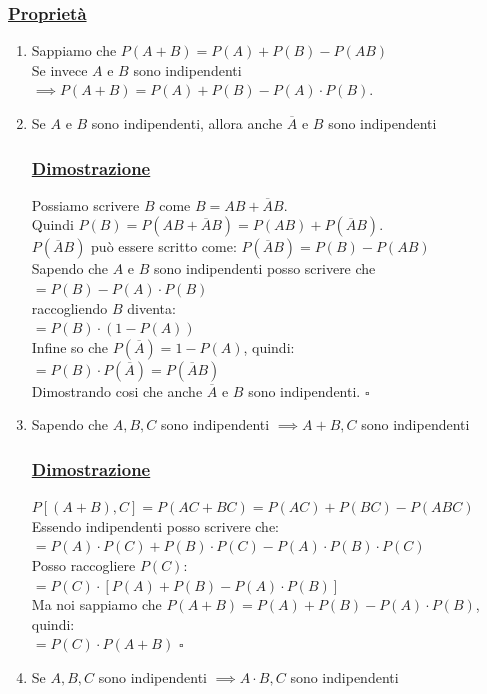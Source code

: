 \documentclass{article}
\begin{document}
\subsubsection{\underline{Proprietà}}
\begin{enumerate}
    \item Sappiamo che $P(A+B) = P(A) + P(B) - P(AB)$ \\
    Se invece $A$ e $B$ sono indipendenti $\implies P(A+B)=P(A)+P(B)-P(A)\cdot P(B)$.
    \item Se $A$ e $B$ sono indipendenti, allora anche $\overline{A}$ e $B$ sono indipendenti
    \subsubsection{\underline{Dimostrazione}}
    Possiamo scrivere $B$ come $B = AB + \overline AB$. \\
    Quindi $P(B) = P(AB + \overline AB) = P(AB) + P(\overline AB)$. \\
    $P(\overline AB)$ può essere scritto come: $P(\overline AB) = P(B)-P(AB)$ \\
    Sapendo che $A$ e $B$ sono indipendenti posso scrivere che \\
    $=P(B)-P(A)\cdot P(B)$ \\
    raccogliendo $B$ diventa: \\
    $ = P(B) \cdot \left( 1 - P(A)\right)$ \\
    Infine so che $P(\overline A) = 1 - P(A)$, quindi: \\
    $ = P(B) \cdot  P(\overline A) = P(\overline A B)$ \\
    Dimostrando cosi che anche $\overline{A}$ e $B$ sono indipendenti. 
    \hspace*{0pt}\hfill $\square$ 
    \item Sapendo che $A,B,C$ sono indipendenti $\implies A+B, C $ sono indipendenti 
    \subsubsection{\underline{Dimostrazione}}
    $P[(A+B),C] = P(AC+BC) = P(AC) + P(BC) - P(ABC)$ \\
    Essendo indipendenti posso scrivere che: \\
    $= P(A)\cdot P(C) + P(B)\cdot P(C) - P(A) \cdot P(B) \cdot P(C)$ \\
    Posso raccogliere $P(C)$: \\
    $= P(C) \cdot [P(A) + P(B) - P(A) \cdot P(B)]$ \\
    Ma noi sappiamo che $P(A+B) = P(A) + P(B) - P(A)\cdot P(B)$, quindi: \\
    $= P(C) \cdot P(A+B)$
    \hspace*{0pt}\hfill $\square$
    \item Se $A,B,C $ sono indipendenti $\implies A\cdot B, C $ sono indipendenti

\end{enumerate}
\end{document}

